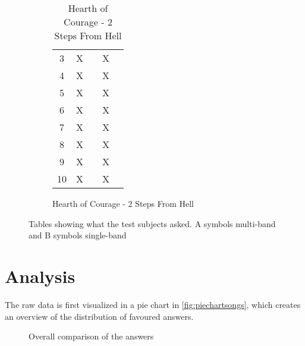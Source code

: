 \begin{figure}[H]
\begin{subfigure}[t]{0.20\textwidth}
\begin{table}[H]
\begin{tabular}{ccccc}
3          & X         &           & X         &          \\
4          & X         &           & X         &          \\ 
5          & X         &           & X         &          \\ \hline
6          & X         &           & X         &          \\
7          & X         &           & X         &          \\
8          & X         &           & X         &          \\
9          & X         &           & X         &          \\
10         & X         &           & X         &          \\ \bottomrule
\end{tabular}
\caption{Hearth of Courage - 2 Steps From Hell}
\label{tab:HearthofCourage}
\end{table}
\end{subfigure}

\caption{Tables showing what the test subjects asked. A symbols multi-band and B symbols single-band}
\label{tab:combinedanswers}
\end{figure}  

\vspace*{-5mm}
\section{Analysis}
The raw data is first visualized in a pie chart in \autoref{fig:piechartsongs}, which creates an overview of the distribution of favoured answers.
\begin{figure}[H]
\centering
{}
\caption{Overall comparison of the answers}
\label{fig:piechartsongs}
\end{figure}

